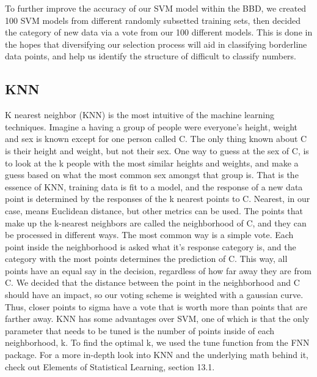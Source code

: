 \documentclass[11pt, oneside]{article}   	%
\begin{document}
To further improve the accuracy of our SVM model within the BBD, we created 100 SVM models from different randomly subsetted training sets, then decided the category of new data via a vote from our 100 different models. This is done in the hopes that diversifying our selection process will aid in classifying borderline data points, and help us identify the structure of difficult to classify numbers.
\subsection{KNN}
K nearest neighbor (KNN) is the most intuitive of the machine learning techniques. Imagine a having a group of people were everyone's height, weight and sex is known except for one person called C.   The only thing known about C is their height and weight, but not their sex. One way to guess at the sex of C, is to look at the k people with the most similar heights and weights, and make a guess based on what the most common sex amongst that group is. That is the essence of KNN, training data is fit to a model, and the response of a new data point is determined by the responses of the k nearest points to C. Nearest, in our case, means Euclidean distance, but other metrics can be used. The points that make up the k-nearest neighbors are called the neighborhood of C, and they can be processed in different ways. The most common way is a simple vote. Each point inside the neighborhood is asked what it's response category is, and the category with the most points determines the prediction of C. This way, all points have an equal say in the decision, regardless of how far away they are from C. We decided that the distance between the point in the neighborhood and C should have an impact, so our voting scheme is weighted with a gaussian curve. Thus, closer points to sigma have a vote that is worth more than points that are farther away. KNN has some advantages over SVM, one of which is that the only parameter that needs to be tuned is the number of points inside of each neighborhood, k. To find the optimal k, we used the tune function from the FNN package. \cite{FNN} For a more in-depth look into KNN and the underlying math behind it, check out Elements of Statistical Learning, section 13.1. \cite{KNNBook}
\end{document}
